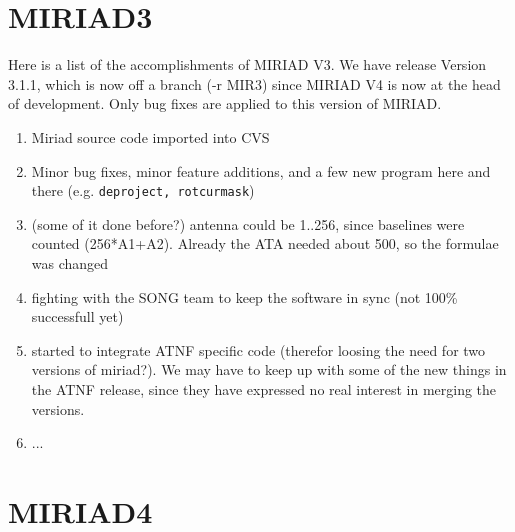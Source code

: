 \section{MIRIAD3}

Here is a list of the accomplishments of MIRIAD V3. We have
release Version 3.1.1, which is now off a branch (-r MIR3) since MIRIAD V4 is
now at the head of development. Only bug fixes are applied to this version
of MIRIAD.

\begin{enumerate}

\item
Miriad source code imported into CVS

\item
Minor bug fixes, minor feature additions,
and a few new program here and there (e.g. {\tt deproject, rotcurmask})

\item
(some of it done before?)
antenna could be 1..256, since baselines were counted (256*A1+A2).  Already the
ATA needed about 500, so the formulae was changed

\item
fighting with the SONG team to keep the software in sync (not 100\% successfull yet)

\item
started to integrate ATNF specific code (therefor loosing the need for two
versions of miriad?). We may have to keep up with some of the new things
in the ATNF release, since they have expressed no real interest in
merging the versions.

\item
...

\end{enumerate}


\section{MIRIAD4}

